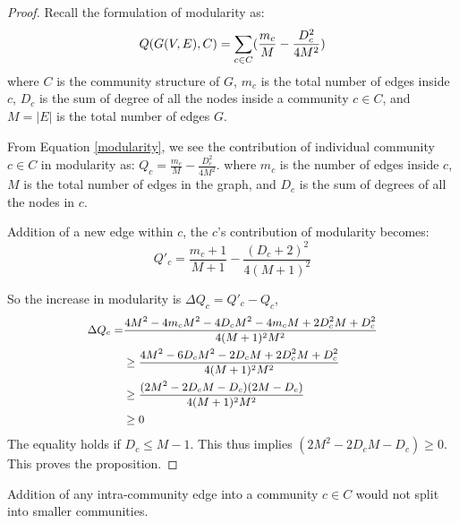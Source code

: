 \begin{proof}
Recall the formulation of modularity as:
\begin{equation}\label{modularity}\small
Q(G(V,E),C)=\sum_{c\in C} (\frac{m_c}{M} - \frac{D_c^2}{4M^2})
\end{equation}
where $C$ is the community structure of $G$, $m_c$ is the total number of edges inside $c$, $D_c$ is the sum of degree of all the nodes inside a community $c\in C$, and $M=|E|$ is the total number of edges $G$.


From Equation \ref{modularity}, we see the contribution of individual community $c\in C$ in modularity as: $Q_c=\frac{m_c}{M} - \frac{D_c^2}{4M^2}$. 
where $m_c$ is the number of edges inside $c$, $M$ is the total number of edges in the graph, and $D_c$ is the sum of degrees of all the nodes in $c$. 

Addition of a new edge within $c$, the $c$'s contribution of modularity becomes:
\[
Q'_c=\frac{m_c+1}{M+1} - \frac{(D_c+2)^2}{4(M+1)^2}
\]

So the increase in modularity is $\Delta Q_c=Q'_c-Q_c$,
\[\small
\begin{split}
\Delta Q_c=&\frac{4M^2-4m_cM^2-4D_cM^2-4m_cM+2D_c^2M+D_c^2}{4(M+1)^2M^2}\\
&\geq \frac{4M^2-6D_cM^2-2D_cM+2D_c^2M+D_c^2}{4(M+1)^2M^2}\\
&\geq\frac{(2M^2-2D_cM-D_c)(2M-D_c)}{4(M+1)^2M^2}\\
&\geq 0
\end{split}
\]
The equality holds if $D_c\leq M-1$. This thus implies $(2M^2-2D_cM-D_c)\geq 0$. This proves the proposition.
\end{proof}




\begin{prop}\label{2}
Addition of any intra-community edge into a community $c\in C$ would not split into smaller communities.
\end{prop}



